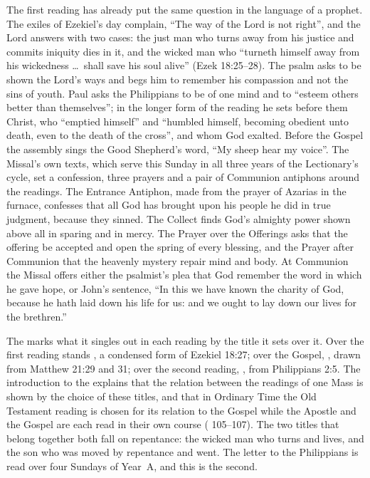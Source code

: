The first reading has already put the same question in the language of a
prophet. The exiles of Ezekiel's day complain, ``The way of the Lord is not
right'', and the Lord answers with two cases: the just man who turns away from
his justice and commits iniquity dies in it, and the wicked man who
``turneth himself away from his wickedness \ldots\ shall save his soul alive''
(Ezek 18:25--28). The psalm asks to be shown the Lord's ways and begs him to
remember his compassion and not the sins of youth. Paul asks the Philippians
to be of one mind and to ``esteem others better than themselves''; in the
longer form of the reading he sets before them Christ, who ``emptied himself''
and ``humbled himself, becoming obedient unto death, even to the death of the
cross'', and whom God exalted. Before the Gospel the assembly sings the Good
Shepherd's word, ``My sheep hear my voice''. The Missal's own texts, which
serve this Sunday in all three years of the Lectionary's cycle, set a
confession, three prayers and a pair of Communion antiphons around the
readings. The Entrance Antiphon, made from the prayer of Azarias in the
furnace, confesses that all God has brought upon his people he did in true
judgment, because they sinned. The Collect finds God's almighty power shown
above all in sparing and in mercy. The Prayer over the Offerings asks that the
offering be accepted and open the spring of every blessing, and the Prayer
after Communion that the heavenly mystery repair mind and body. At Communion
the Missal offers either the psalmist's plea that God remember the word in
which he gave hope, or John's sentence, ``In this we have known the charity of
God, because he hath laid down his life for us: and we ought to lay down our
lives for the brethren.''

The  marks what it singles out in each reading by
the title it sets over it. Over the first reading stands , a condensed form of Ezekiel
18:27; over the Gospel, , drawn from Matthew 21:29 and 31; over the second
reading, , from Philippians 2:5.
The introduction
to the  explains that the relation between the readings of one Mass
is shown by the choice of these titles, and that in Ordinary Time the Old
Testament reading is chosen for its relation to the Gospel while the Apostle
and the Gospel are each read in their own course ( 105--107).
The two titles that belong together both fall on repentance: the wicked man
who turns and lives, and the son who was moved by repentance and went. The
letter to the Philippians is read over four Sundays of Year~A, and this is the
second.

